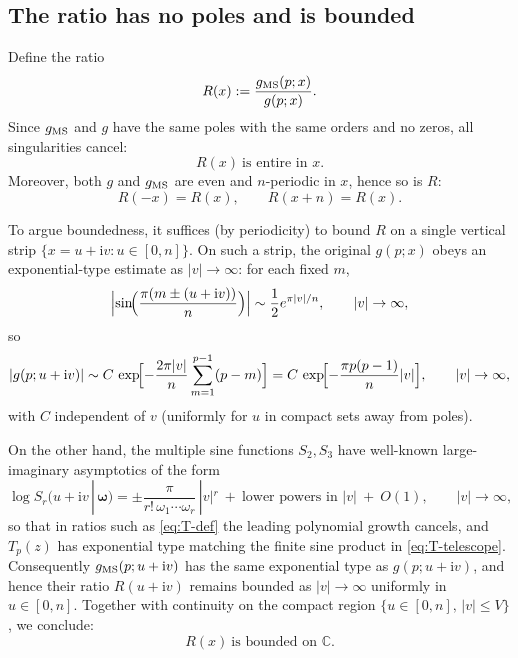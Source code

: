 \documentclass[11pt]{article}
\newcommand{\ii}{\mathrm{i}}
\begin{document}
{  \subsection*{The ratio has no poles and is bounded}

  Define the ratio
  \begin{equation}
    R(x):=\frac{g_{\rm MS}(p;x)}{g(p;x)}.
  \end{equation}
  Since $g_{\rm MS}$ and $g$ have the same poles with the same orders and no zeros,
  all singularities cancel:
  \begin{equation}
    \boxed{R(x)\ \text{is entire in }x.}
  \end{equation}
  Moreover, both $g$ and $g_{\rm MS}$ are even and $n$-periodic in $x$, hence so
  is $R$:
  \begin{equation}
    R(-x)=R(x),\qquad R(x+n)=R(x). \label{eq:R-periodic}
  \end{equation}

  To argue boundedness, it suffices (by periodicity) to bound $R$ on a single
  vertical strip $\{x=u+\ii v: u\in[0,n]\}$. On such a strip, the original
  $g(p;x)$ obeys an exponential-type estimate as $|v|\to\infty$: for each fixed $m$,
  \begin{equation}
    \Bigl|\sin\!\Bigl(\frac{\pi(m\pm(u+\ii v))}{n}\Bigr)\Bigr| \sim \frac{1}{2}e^{\pi
    |v|/n}, \qquad |v|\to\infty,
  \end{equation}
  so
  \begin{equation}
    |g(p;u+\ii v)| \sim C\,\exp\!\Bigl[-\frac{2\pi|v|}{n}\sum_{m=1}^{p-1}(p-m)\Bigr
    ] = C\,\exp\!\Bigl[-\frac{\pi p(p-1)}{n}|v|\Bigr], \qquad |v|\to\infty, \label{eq:g-asymp}
  \end{equation}
  with $C$ independent of $v$ (uniformly for $u$ in compact sets away from poles).

  On the other hand, the multiple sine functions $S_{2},S_{3}$ have well-known large-imaginary
  asymptotics of the form
  \begin{equation}
    \log S_{r}(u+\ii v\,|\,\boldsymbol{\omega}) = \pm \frac{\pi}{r!\,\omega_{1}\cdots
    \omega_{r}}\,|v|^{r}\ +\ \text{lower powers in }|v| \ +\ O(1), \qquad |v|\to
    \infty,
  \end{equation}
  so that in ratios such as \eqref{eq:T-def} the leading polynomial growth
  cancels, and $T_{p}(z)$ has exponential type matching the finite sine product in
  \eqref{eq:T-telescope}. Consequently $g_{\rm MS}(p;u+\ii v)$ has the same exponential
  type as $g(p;u+\ii v)$, and hence their ratio $R(u+\ii v)$ remains bounded as
  $|v|\to\infty$ uniformly in $u\in[0,n]$. Together with continuity on the compact
  region $\{u\in[0,n],\,|v|\le V\}$, we conclude:
  \begin{equation}
    \boxed{R(x)\ \text{is bounded on }\mathbb{C}.}
  \end{equation}

}
\end{document}
